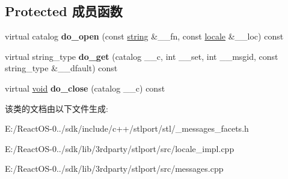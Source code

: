 \subsection*{Protected 成员函数}
\begin{DoxyCompactItemize}
\item 
\mbox{\label{classmessages_3_01wchar__t_01_4_af63ec3f1f456cd96a05529057010ea49}} 
virtual catalog {\bfseries do\+\_\+open} (const \hyperlink{structstring}{string} \&\+\_\+\+\_\+fn, const \hyperlink{classlocale}{locale} \&\+\_\+\+\_\+loc) const
\item 
\mbox{\label{classmessages_3_01wchar__t_01_4_a81eab07cce68d535b2a6d5061e65ed78}} 
virtual string\+\_\+type {\bfseries do\+\_\+get} (catalog \+\_\+\+\_\+c, int \+\_\+\+\_\+set, int \+\_\+\+\_\+msgid, const string\+\_\+type \&\+\_\+\+\_\+dfault) const
\item 
\mbox{\label{classmessages_3_01wchar__t_01_4_ae697adffe6483ad90922e65affc1b5b2}} 
virtual \hyperlink{interfacevoid}{void} {\bfseries do\+\_\+close} (catalog \+\_\+\+\_\+c) const
\end{DoxyCompactItemize}


该类的文档由以下文件生成\+:\begin{DoxyCompactItemize}
\item 
E\+:/\+React\+O\+S-\/0../sdk/include/c++/stlport/stl/\+\_\+messages\+\_\+facets.\+h\item 
E\+:/\+React\+O\+S-\/0../sdk/lib/3rdparty/stlport/src/locale\+\_\+impl.\+cpp\item 
E\+:/\+React\+O\+S-\/0../sdk/lib/3rdparty/stlport/src/messages.\+cpp\end{DoxyCompactItemize}
